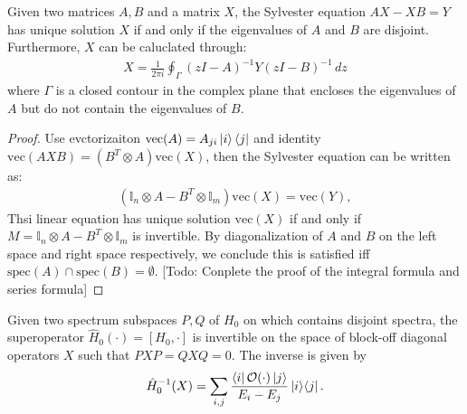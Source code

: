 \begin{theorem}
\label{thm:sylvester}
Given two matrices $A, B$ and a matrix $X$, the Sylvester equation $AX - XB = Y$ has unique solution $X$ if and only if the eigenvalues of $A$ and $B$ are disjoint. Furthermore,
$X$ can be caluclated through:
\begin{align}
X = \frac{1}{2\pi i} \oint_\Gamma (zI-A)^{-1} Y (zI-B)^{-1} \,dz
\end{align}
where $\Gamma$ is a closed contour in the complex plane that encloses the eigenvalues of $A$ but do not contain the eigenvalues of $B$.
\end{theorem}

\begin{proof}
Use evctorizaiton $\mathrm{vec}(A) = A_{ji} \ket{i}\bra{j}$ and identity $\mathrm{vec}(AXB) = (B^T \otimes A)\mathrm{vec}(X)$, then the Sylvester equation can be written as:
\begin{align}
(\mathbb{I}_n \otimes A - B^T \otimes \mathbb{I}_m)\mathrm{vec}(X) = \mathrm{vec}(Y),
\end{align}
Thsi linear equation has unique solution $\mathrm{vec}(X)$ if and only if $M = \mathbb{I}_n \otimes A - B^T \otimes \mathbb{I}_m$ is invertible. By diagonalization of $A$ and $B$ on the left space and right space respectively, we conclude this is satisfied iff $\text{spec}(A) \cap \text{spec}(B) = \emptyset$.
\color{red}[Todo: Conplete the proof of the integral formula and series formula]\color{black}
\end{proof}

\begin{lemma}
    \label{lem:inv_commut}
    Given two spectrum subspaces $P,Q$ of $H_0$ on which contains disjoint spectra, the superoperator $\hat{H}_0(\cdot) = [H_0, \cdot]$ is invertible on the space of block-off diagonal operators $X$ such that $PXP = QXQ = 0$. The inverse is given by
\begin{align}
    \hat{H}_0^{-1}(X) =  \sum_{i,j} \frac{\bra{i} \mathcal{O}(\cdot) \ket{j}}{E_i - E_j} \ket{i}\!\bra{j}.
\end{align}
\end{lemma}

